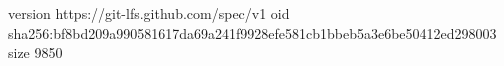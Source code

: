 version https://git-lfs.github.com/spec/v1
oid sha256:bf8bd209a990581617da69a241f9928efe581cb1bbeb5a3e6be50412ed298003
size 9850
